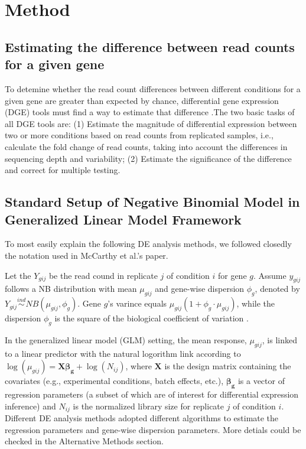 \chapter{Method}

\section{Estimating the difference between read counts for a given gene}

To detemine whether the read count differences between different conditions for a given gene are greater than expected by chance, differential gene expression (DGE) tools must find a way to estimate that difference \citep{dundar2015introduction}.The two basic tasks of all DGE tools are: (1) Estimate the magnitude of differential expression between two or more conditions based on read counts from replicated samples, i.e., calculate the fold change of read counts, taking into account the differences in sequencing depth and variability; (2) Estimate the significance of the difference and correct for multiple testing. 

\section{Standard Setup of Negative Binomial Model in Generalized Linear Model Framework}

To most easily explain the following DE analysis methods, we followed closedly the notation used in McCarthy et al.'s paper\citep{mccarthy2012differential}.

Let the $Y_{gij}$ be the read cound in replicate $j$ of condition $i$ for gene $g$. Assume $y_{gij}$ follows a NB distribution with mean $\mu_{gij}$ and gene-wise dispersion $\phi_g$, denoted by $Y_{gij} \stackrel{ind}{\sim} NB(\mu_{gij}, \phi_g)$. Gene $g$'s varince equals $\mu_{gij}(1+\phi_g \cdot \mu_{gij})$, while the dispersion $\phi_g$ is the square of the biological coefficient of variation \citep{mccarthy2012differential}. 

In the generalized linear model (GLM) setting, the mean response, $\mu_{gij}$, is linked to a  linear predictor with the natural logorithm link according to $\log(\mu_{gij}) = \mathbf{X\beta_g} + \log(N_{ij})$, where $\mathbf{X}$ is the design matrix containing the covariates (e.g., experimental conditions, batch effects, etc.), $\mathbf{\beta_g}$ is a vector of regression parameters (a subset of which are of interest for differential expression inference) and $N_{ij}$ is the normalized library size for replicate $j$ of condition $i$. Different DE analysis methods adopted different algorithms to estimate the regression parameters and gene-wise dispersion parameters. More detials could be checked in the Alternative Methods section. 



